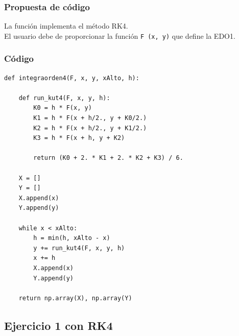 \documentclass[12pt]{beamer}
\begin{document}
\begin{frame}
\frametitle{Propuesta de código}
La función  implementa el método RK4.
\\
\bigskip
\pause
El usuario debe de proporcionar la función \texttt{F (x, y)} que define la EDO1.
\end{frame}
\begin{frame}
\frametitle{Código}
\begin{lstlisting}[caption=Código para el método RK4]
def integraorden4(F, x, y, xAlto, h):

    def run_kut4(F, x, y, h):
        K0 = h * F(x, y)
        K1 = h * F(x + h/2., y + K0/2.)
        K2 = h * F(x + h/2., y + K1/2.)
        K3 = h * F(x + h, y + K2)
        
        return (K0 + 2. * K1 + 2. * K2 + K3) / 6.
    
    X = []
    Y = []
    X.append(x)
    Y.append(y)
    
    while x < xAlto:
        h = min(h, xAlto - x)
        y += run_kut4(F, x, y, h)
        x += h
        X.append(x)
        Y.append(y)
    
    return np.array(X), np.array(Y)
\end{lstlisting}
\end{frame}

\subsection{Ejercicio 1 con RK4}
\end{document}
